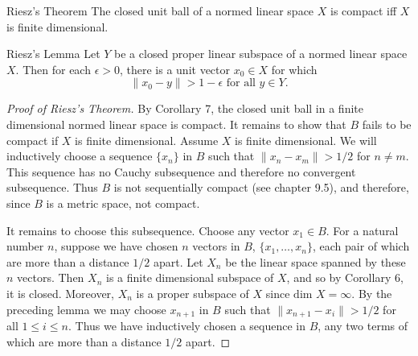 \begin{namedthm*}{Riesz's Theorem}
    The closed unit ball of a normed linear space $X$ is compact iff $X$ is finite dimensional.
\end{namedthm*}
\begin{namedthm*}{Riesz's Lemma}
    Let $Y$ be a closed proper linear subspace of a normed linear space $X$.
    Then for each $\epsilon>0$, there is a unit vector $x_0\in X$ for which 
    \[
        \|x_0-y\|>1-\epsilon\text{ for all }y\in Y.
    \]
\end{namedthm*}
\begin{proof}[Proof of Riesz's Theorem]
    By Corollary 7, the closed unit ball in a finite dimensional normed linear space is compact.
    It remains to show that $B$ fails to be compact if $X$ is finite dimensional.
    Assume $X$ is finite dimensional.
    We will inductively choose a sequence $\{x_n\}$ in $B$ such that $\|x_n-x_m\|>1/2$ for $n\neq m$.
    This sequence has no Cauchy subsequence and therefore no convergent subsequence.
    Thus $B$ is not sequentially compact (see chapter 9.5), and therefore, since $B$ is a metric space, not compact.

    It remains to choose this subsequence.
    Choose any vector $x_1\in B$.
    For a natural number $n$, suppose we have chosen $n$ vectors in $B$, $\{x_1,\dots,x_n\}$, each pair of which are more than a distance $1/2$ apart.
    Let $X_n$ be the linear space spanned by these $n$ vectors.
    Then $X_n$ is a finite dimensional subspace of $X$, and so by Corollary 6, it is closed.
    Moreover, $X_n$ is a proper subspace of $X$ since $\text{dim }X=\infty$.
    By the preceding lemma we may choose $x_{n+1}$ in $B$ such that $\|x_{n+1}-x_i\|>1/2$ for all $1\le i\le n$.
    Thus we have inductively chosen a sequence in $B$, any two terms of which are more than a distance $1/2$ apart.
\end{proof}

